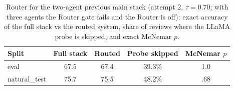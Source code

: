 \begin{table}[htbp]
\centering
\caption{Router for the two-agent previous main stack (attempt 2, $\tau = 0.70$; with three agents the Router gate fails and the Router is off): exact accuracy of the full stack vs the routed system, share of reviews where the LLaMA probe is skipped, and exact McNemar $p$.}
\label{tab:e23router}
\small
\begin{tabular}{lcccc}
\toprule
\textbf{Split} & \textbf{Full stack} & \textbf{Routed} & \textbf{Probe skipped} & \textbf{McNemar $p$} \\
\midrule
eval & 67.5 & 67.4 & 39.3\% & 1.0 \\
natural\_test & 75.7 & 75.5 & 48.2\% & .68 \\
\bottomrule
\end{tabular}
\end{table}

